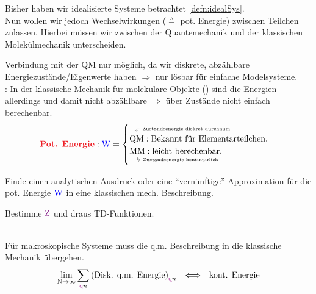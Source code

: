 \begin{sectionbox}[Ziel]\nospacing
  Bisher haben wir idealisierte Systeme betrachtet \cref{defn:idealSys}.\\
  Nun wollen wir jedoch Wechselwirkungen ($\corresponds$ pot. Energie) zwischen Teilchen zulassen.
  Hierbei müssen wir zwischen der Quantemechanik und der klassischen Molekülmechanik unterscheiden.
\end{sectionbox}
\begin{sectionbox}[Problem]\nospacing
   Verbindung mit der QM nur möglich, da
  wir diskrete, abzählbare Energiezustände/Eigenwerte haben $\Rightarrow$ nur lösbar für einfache Modelsysteme.\\
  : In der klassische Mechanik für molekulare Objekte () sind die Energien allerdings 
  und damit nicht abzählbare $\Rightarrow$  über Zustände nicht einfach berechenbar.
  \begin{align*}
    \rdb{\text{Pot. Energie}}: \Wpot=
      \begin{cases}
        \tura{\text{QM}}{\normalfont{Zustandsenergie diskret durchnum.}}: \text{Bekannt für Elementarteilchen.}\\
        \bdra{\text{MM}}{\normalfont{Zustandsenergie kontinuirlich}}: \text{leicht berechenbar.}\\
      \end{cases}
  \end{align*}
\end{sectionbox}
\begin{sectionbox}[Vorgehensweise]\nospacing
 \begin{circlelist}
     \item Finde einen analytischen Ausdruck oder eine ``vernünftige'' Approximation für die pot. Energie $\textcolor{blue}{\mathrm{W}}$ in eine klassischen
   mech. Beschreibung.
     \item Bestimme $\Zz$ und draus TD-Funktionen.
 \end{circlelist}
\end{sectionbox}
\begin{princpbox}
  \begin{princip}[Korrespondenzprinzip]\nospacing \leavevmode\\
    Für makroskopische Systeme muss die q.m. Beschreibung in die klassische Mechanik übergehen.
    \begin{align*}
      \lim_{\Nz\to\infty}\sum_{\nqz}\left(\text{Disk. q.m. Energie}\right)_{\nqz}&&\Longleftrightarrow&&\text{kont. Energie} 
    \end{align*}
  \end{princip}
\end{princpbox}
